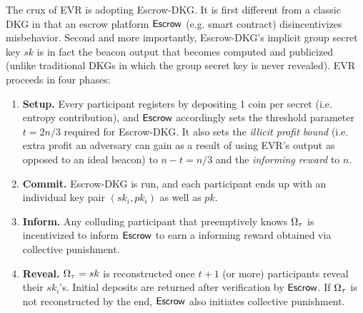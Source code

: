 
The crux of EVR is adopting Escrow-DKG. It is first different from a classic DKG in that an escrow platform $\mathsf{Escrow}$ (e.g. smart contract) disincentivizes misbehavior. Second and more importantly, Escrow-DKG's implicit group secret key $sk$ is in fact the beacon output that becomes computed and publicized (unlike traditional DKGs in which the group secret key is never revealed). EVR proceeds in four phases:
\begin{enumerate}
    \item \textbf{Setup.} Every participant registers by depositing 1 coin per secret (i.e. entropy contribution), and $\mathsf{Escrow}$ accordingly sets the threshold parameter $t = 2n / 3$ required for Escrow-DKG. It also sets the \textit{illicit profit bound} (i.e. extra profit an adversary can gain as a result of using EVR's output as opposed to an ideal beacon) to $n - t = n / 3$ and the \textit{informing reward} to $n$.
    \item \textbf{Commit.} Escrow-DKG is run, and each participant ends up with an individual key pair $(sk_i, pk_i)$ as well as $pk$.
    \item \textbf{Inform.} Any colluding participant that preemptively knows $\Omega_\tau$ is incentivized to inform $\mathsf{Escrow}$ to earn a informing reward obtained via collective punishment. %
    \item \textbf{Reveal.} $\Omega_\tau = sk$ is reconstructed once $t + 1$ (or more) participants reveal their $sk_i$'s. Initial deposits are returned after verification by $\mathsf{Escrow}$. If $\Omega_\tau$ is not reconstructed by the end, $\mathsf{Escrow}$ also initiates collective punishment.
\end{enumerate}

